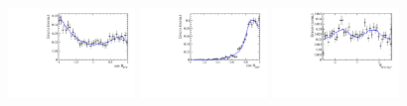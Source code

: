 \begin{figure}[h]
		\includegraphics[width=0.3\textwidth, height = !]{figs/fullFit/signal/h_cosTheta_Kpi.pdf} 
		\includegraphics[width=0.3\textwidth, height = !]{figs/fullFit/signal/h_cosTheta_Dspi.pdf} 
		\includegraphics[width=0.3\textwidth, height = !]{figs/fullFit/signal/h_phi_Kpi_Dspi.pdf} 
		

%

		\caption{} 		
\end{figure}	
